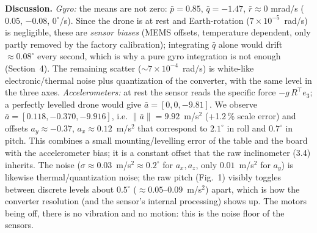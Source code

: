 \textbf{Discussion.}
\emph{Gyro:} the means are not zero: $\bar p=0.85$, $\bar q=-1.47$, $\bar r\approx0$ mrad/s ($0.05$, $-0.08$, $0^\circ$/s).
Since the drone is at rest and Earth-rotation ($7\times10^{-5}$~rad/s) is negligible, these are \emph{sensor biases}
(MEMS offsets, temperature dependent, only partly removed by the factory calibration); integrating $\bar q$ alone would drift
$\approx0.08^\circ$ every second, which is why a pure gyro integration is not enough (Section~4). The remaining scatter
($\sim7\times10^{-4}$~rad/s) is white-like electronic/thermal noise plus quantization of the converter, with the same level in the three axes.
\emph{Accelerometers:} at rest the sensor reads the specific force $-g\,R^\top e_3$; a perfectly levelled drone would give
$\bar a=[0,0,-9.81]$. We observe $\bar a=[0.118,-0.370,-9.916]$, i.e. $\|\bar a\|=9.92$~m/s$^2$ (+1.2\,\% scale error) and
offsets $a_y\approx-0.37$, $a_x\approx0.12$~m/s$^2$ that correspond to $2.1^\circ$ in roll and $0.7^\circ$ in pitch. This combines
a small mounting/levelling error of the table and the board with the accelerometer bias; it is a constant offset that the raw inclinometer
(3.4) inherits. The noise ($\sigma\approx0.03$~m/s$^2\approx0.2^\circ$ for $a_x,a_z$, only $0.01$~m/s$^2$ for $a_y$) is likewise
thermal/quantization noise; the raw pitch (Fig.~1) visibly toggles between discrete levels about $0.5^\circ$ ($\approx0.05$--$0.09$~m/s$^2$) apart, which is how the converter resolution
(and the sensor's internal processing) shows up. The motors being off, there is no vibration and no motion: this is the noise floor of the sensors.
